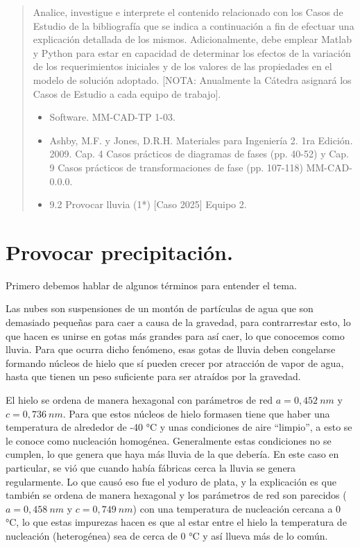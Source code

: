 \documentclass[12pt,a4paper]{article}
\begin{document}

\tableofcontents
\begin{abstract}
    Analice, investigue e interprete el contenido relacionado con los Casos de Estudio de la bibliografía que se indica a continuación a fin de efectuar una explicación detallada de los mismos. Adicionalmente, debe emplear Matlab y Python para estar en capacidad de determinar los efectos de la variación de los requerimientos iniciales y de los valores de las propiedades en el modelo de solución adoptado. [NOTA: Anualmente la Cátedra asignará los Casos de Estudio a cada equipo de trabajo].
    \begin{itemize}
        \item Software. {MM-CAD-TP 1-03}.
        \item Ashby, M.F. y Jones, D.R.H. Materiales para Ingeniería 2. 1ra Edición. 2009. Cap. 4 Casos prácticos de diagramas de fases (pp. 40-52) y Cap. 9 Casos prácticos de transformaciones de fase (pp. 107-118) {MM-CAD-0.0.0}.
        \item 9.2 Provocar lluvia (1*) [Caso 2025] Equipo 2.
    \end{itemize}
\end{abstract}
\section{Provocar precipitación.}
Primero debemos hablar de algunos términos para entender el tema.

Las nubes son suspensiones de un montón de partículas de agua que son demasiado pequeñas para caer a causa de la gravedad, para contrarrestar esto, lo que hacen es unirse en gotas más grandes para así caer, lo que conocemos como lluvia. Para que ocurra dicho fenómeno, esas gotas de lluvia deben congelarse formando núcleos de hielo que sí pueden crecer por atracción de vapor de agua, hasta que tienen un peso suficiente para ser atraídos por la gravedad.

El hielo se ordena de manera hexagonal con parámetros de red $a=0,452\:nm$ y $c=0,736\:nm$. Para que estos núcleos de hielo formasen tiene que haber una temperatura de alrededor de -40 °C y unas condiciones de aire \textquotedblleft{}limpio\textquotedblright{}, a esto se le conoce como nucleación homogénea. Generalmente estas condiciones no se cumplen, lo que genera que haya más lluvia de la que debería. En este caso en particular, se vió que cuando había fábricas cerca la lluvia se genera regularmente. Lo que causó eso fue el yoduro de plata, y la explicación es que también se ordena de manera hexagonal y los parámetros de red son parecidos ($a=0,458\:nm$ y $c=0,749\: nm$) con una temperatura de nucleación cercana a 0 °C, lo que estas impurezas hacen es que al estar entre el hielo la temperatura de nucleación (heterogénea) sea de cerca de 0 °C y así llueva más de lo común.
\end{document}
